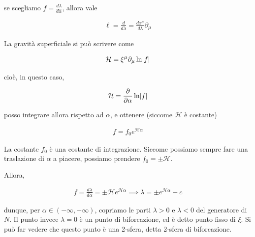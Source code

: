 \documentclass{report}
\begin{document}
se scegliamo \(f = \frac{d\lambda}{d\alpha}\), allora vale 

\begin{align}
    \ell = \frac{d}{d\lambda} = \frac{dx^\mu}{d\lambda}\partial_\mu
\end{align}

La gravità superficiale si può scrivere come 

\begin{align}
    \mathcal{H} = \xi^\mu \partial_\mu \ln \lvert f\rvert
\end{align}

cioè, in questo caso, 

\begin{align}
    \mathcal{H} = \frac{\partial}{\partial \alpha}\ln \lvert f\rvert
\end{align}

posso integrare allora rispetto ad \(\alpha\), e ottenere (siccome \(\mathcal{H}\) è costante)

\begin{align}
    f = f_0 e^{\mathcal{H}\alpha}
\end{align}

La costante \(f_0\) è una costante di integrazione. Siccome possiamo sempre fare una traslazione di \(\alpha\) a piacere, possiamo prendere \(f_0 = \pm\mathcal{H}\). 

Allora, 

\begin{align}
    f = \frac{d\lambda}{d\alpha} = \pm\mathcal{H}e^{\mathcal{H}\alpha} \implies \lambda = \pm e^{\mathcal{H}\alpha} + c 
\end{align}

dunque, per \(\alpha \in (-\infty, +\infty)\), copriamo le parti \(\lambda > 0\) e \(\lambda <0\) del generatore di \(N\). Il punto invece \(\lambda =0\) è un punto di biforcazione, ed è detto punto fisso di \(\xi\). Si può far vedere che questo punto è una 2-sfera, detta 2-sfera di biforcazione. 
\end{document}
